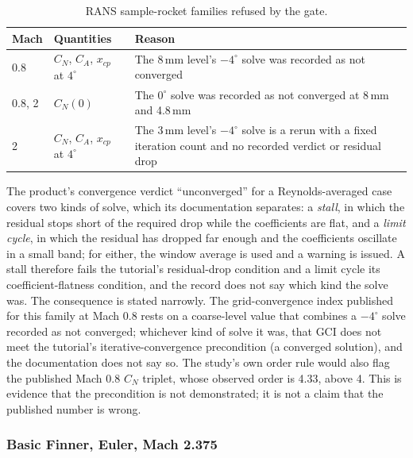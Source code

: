 \documentclass[11pt,a4paper]{article}
\begin{document}
\begin{table}[t]
\centering
\caption{RANS sample-rocket families refused by the gate.}
\label{tab:refused}
\small
\begin{tabular}{@{}llp{7.3cm}@{}}
\toprule
Mach & Quantities & Reason \\
\midrule
0.8 & $C_N$, $C_A$, $x_{cp}$ at $4^\circ$ & The 8\,mm level's $-4^\circ$ solve was recorded as not converged \\
0.8, 2 & $C_N(0)$ & The $0^\circ$ solve was recorded as not converged at 8\,mm and 4.8\,mm \\
2 & $C_N$, $C_A$, $x_{cp}$ at $4^\circ$ & The 3\,mm level's $-4^\circ$ solve is a rerun with a fixed iteration count and no recorded verdict or residual drop \\
\bottomrule
\end{tabular}
\end{table}

The product's convergence verdict ``unconverged'' for a Reynolds-averaged case covers two kinds of solve, which its documentation separates:
a \emph{stall}, in which the residual stops short of the required drop while the coefficients are flat, and a \emph{limit cycle}, in which the residual has dropped far enough and the coefficients oscillate in a small band;
for either, the window average is used and a warning is issued.
A stall therefore fails the tutorial's residual-drop condition and a limit cycle its coefficient-flatness condition, and the record does not say which kind the solve was.
The consequence is stated narrowly.
The grid-convergence index published for this family at Mach 0.8 rests on a coarse-level value that combines a $-4^\circ$
solve recorded as not converged; whichever kind of solve it was, that GCI does not meet the tutorial's iterative-convergence precondition
(a converged solution), and the documentation does not say so.
The study's own order rule would also flag the published Mach 0.8 $C_N$ triplet, whose observed order is 4.33, above 4.
This is evidence that the precondition is not demonstrated; it is not a claim that the published number is wrong.

\subsubsection{Basic Finner, Euler, Mach 2.375}
\end{document}
